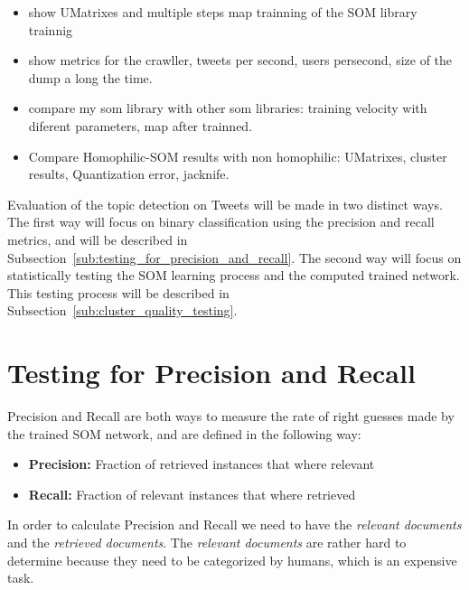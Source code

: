 \begin{itemize}
  \item show UMatrixes and multiple steps map trainning of the SOM library trainnig
  \item show metrics for the crawller, tweets per second, users persecond, size of the dump a long the time.
  \item compare my som library with other som libraries: training velocity with diferent parameters, map after trainned.
  \item Compare Homophilic-SOM results with non homophilic: UMatrixes, cluster results, Quantization error, jacknife. 
\end{itemize}
Evaluation of the topic detection on Tweets will be made in two distinct ways. The first way will focus on  binary classification using the precision and recall metrics, and will be described in Subsection~\ref{sub:testing_for_precision_and_recall}. The second way will focus on statistically testing the SOM learning process and the computed trained network. This testing process will be described in Subsection~\ref{sub:cluster_quality_testing}. 

\section{Testing for Precision and Recall} 
\label{sec:testing_for_precision_and_recall}
Precision and Recall are both ways to measure the rate of right guesses made by the trained SOM network, and are defined in the following way:
\begin{itemize}
  \item \textbf{Precision:} Fraction of retrieved instances that where relevant 
    
  \item \textbf{Recall:} Fraction of relevant instances that where retrieved
    
\end{itemize}

In order to calculate Precision and Recall we need to have the \emph{relevant documents} and the \emph{retrieved documents}. The \emph{relevant documents} are rather hard to determine because they need to be categorized by humans, which is an expensive task.


